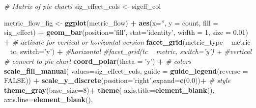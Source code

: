 \documentclass[
]{article}
\newenvironment{Shaded}{\begin{snugshade}}{\end{snugshade}}
\newcommand{\CommentTok}[1]{\textcolor[rgb]{0.56,0.35,0.01}{\textit{#1}}}
\newcommand{\DataTypeTok}[1]{\textcolor[rgb]{0.13,0.29,0.53}{#1}}
\newcommand{\DecValTok}[1]{\textcolor[rgb]{0.00,0.00,0.81}{#1}}
\newcommand{\FloatTok}[1]{\textcolor[rgb]{0.00,0.00,0.81}{#1}}
\newcommand{\KeywordTok}[1]{\textcolor[rgb]{0.13,0.29,0.53}{\textbf{#1}}}
\newcommand{\NormalTok}[1]{#1}
\newcommand{\OperatorTok}[1]{\textcolor[rgb]{0.81,0.36,0.00}{\textbf{#1}}}
\newcommand{\OtherTok}[1]{\textcolor[rgb]{0.56,0.35,0.01}{#1}}
\newcommand{\StringTok}[1]{\textcolor[rgb]{0.31,0.60,0.02}{#1}}
\begin{document}
\begin{Shaded}
\begin{Highlighting}[]
\CommentTok{# Matrix of pie charts}
\NormalTok{  sig_effect_cols <-}\StringTok{ }\NormalTok{sigeff_col}

\NormalTok{  metric_flow_fig <-}\StringTok{ }\KeywordTok{ggplot}\NormalTok{(metric_flow) }\OperatorTok{+}\StringTok{ }
\StringTok{                    }\KeywordTok{aes}\NormalTok{(}\DataTypeTok{x=}\StringTok{''}\NormalTok{, }\DataTypeTok{y =}\NormalTok{ count, }\DataTypeTok{fill =}\NormalTok{ sig_effect) }\OperatorTok{+}
\StringTok{                    }\KeywordTok{geom_bar}\NormalTok{(}\DataTypeTok{position=}\StringTok{'fill'}\NormalTok{,}
                             \DataTypeTok{stat=}\StringTok{'identity'}\NormalTok{, }\DataTypeTok{width =} \DecValTok{1}\NormalTok{, }\DataTypeTok{size =} \FloatTok{0.01}\NormalTok{) }\OperatorTok{+}
\StringTok{                    }\CommentTok{# activate for vertical or horizontal version}
\StringTok{                      }\KeywordTok{facet_grid}\NormalTok{(metric_type }\OperatorTok{~}\StringTok{ }\NormalTok{metric }\OperatorTok{~}\StringTok{ }\NormalTok{tc, }\DataTypeTok{switch=}\StringTok{'y'}\NormalTok{) }\OperatorTok{+}\StringTok{ }\CommentTok{#horizontal}
\StringTok{                      }\CommentTok{#facet_grid(tc ~ metric, switch='y') +  #vertical}
\StringTok{                    }\CommentTok{# convert to pie chart}
\StringTok{                      }\KeywordTok{coord_polar}\NormalTok{(}\DataTypeTok{theta =} \StringTok{'y'}\NormalTok{) }\OperatorTok{+}
\StringTok{                    }\CommentTok{# colors}
\StringTok{                      }\KeywordTok{scale_fill_manual}\NormalTok{(}
                        \DataTypeTok{values=}\NormalTok{sig_effect_cols,}
                        \DataTypeTok{guide =} \KeywordTok{guide_legend}\NormalTok{(}\DataTypeTok{reverse =} \OtherTok{FALSE}\NormalTok{))  }\OperatorTok{+}\StringTok{ }
\StringTok{                        }\KeywordTok{scale_y_discrete}\NormalTok{(}\DataTypeTok{position=}\StringTok{'right'}\NormalTok{,}\DataTypeTok{expand=}\KeywordTok{c}\NormalTok{(}\DecValTok{0}\NormalTok{,}\DecValTok{0}\NormalTok{))}\OperatorTok{+}
\StringTok{                    }\CommentTok{# style}
\StringTok{                      }\KeywordTok{theme_gray}\NormalTok{(}\DataTypeTok{base_size=}\DecValTok{8}\NormalTok{)}\OperatorTok{+}
\StringTok{                      }\KeywordTok{theme}\NormalTok{(}
                        \DataTypeTok{axis.title=}\KeywordTok{element_blank}\NormalTok{(),}
                        \DataTypeTok{axis.line=}\KeywordTok{element_blank}\NormalTok{(),}

\end{Highlighting}
\end{Shaded}
\end{document}
